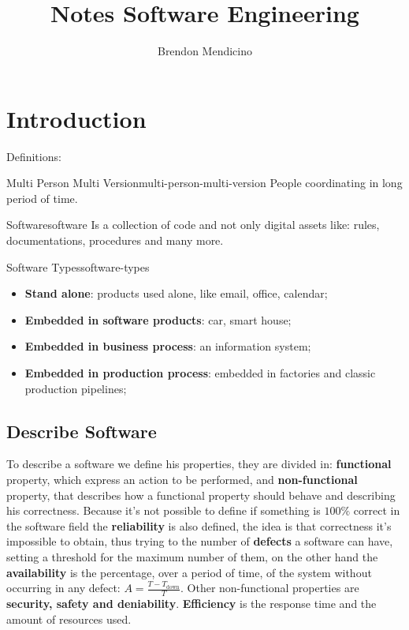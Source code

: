 \documentclass[12pt]{article}
\title{Notes Software Engineering}
\author{Brendon Mendicino}
\begin{document}
\maketitle
\newpage
\tableofcontents
\newpage



\section{Introduction}
Definitions:
\begin{definition}{Multi Person Multi Version}{multi-person-multi-version}
  People coordinating in long period of time.
\end{definition}
\begin{definition}{Software}{software}
  Is a collection of code and not only digital assets like: rules, documentations, procedures and many more. 
\end{definition}
\begin{definition}{Software Types}{software-types}
  \begin{itemize}
    \item \textbf{Stand alone}: products used alone, like email, office, calendar;
    \item \textbf{Embedded in software products}: car, smart house;
    \item \textbf{Embedded in business process}: an information system;
    \item \textbf{Embedded in production process}: embedded in factories and classic production pipelines;
  \end{itemize}
\end{definition}

\subsection{Describe Software}
To describe a software we define his properties, they are divided in: \textbf{functional} property, which express an action to be performed, and \textbf{non-functional} property, that describes how a functional property should behave and describing his correctness. Because it's not possible to define if something is $100\%$ correct in the software field the \textbf{reliability} is also defined, the idea is that correctness it's impossible to obtain, thus trying to the number of \textbf{defects} a software can have, setting a threshold for the maximum number of them, on the other hand the \textbf{availability} is the percentage, over a period of time, of the system without occurring in any defect: $A = \frac{T - T_\text{down}}{T}$. Other non-functional properties are \textbf{security, safety and deniability}. \textbf{Efficiency} is the response time and the amount of resources used.
\end{document}
